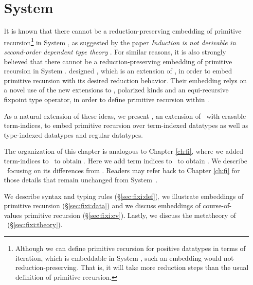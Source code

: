 \chapter{System \Fixi}\label{ch:fixi}

It is known that there cannot be a reduction-preserving embedding of
primitive recursion\footnote{
	Although we can define primitive recursion for positive datatypes
	in terms of iteration, which is embeddable in System \F, such an
	embedding would not reduction-preserving. That is, it will take
	more reduction steps than the usual definition of primitive recursion.
	}
in System \F, as suggested by the paper 
{\it Induction is not derivable in second-order dependent type theory}
\cite{Geuvers01}. For similar reasons, it is also strongly believed that
there cannot be a reduction-preserving embedding of primitive recursion 
in System \Fw. \citet{AbeMat04} designed \Fixw, which is an extension of \Fw,
in order to embed primitive recursion with its desired reduction behavior.
Their embedding relys on a novel use of the new extensions to \Fixw,
polarized kinds and an equi-recursive fixpoint type operator,
in order to define primitive recursion within \Fixw.

As a natural extension of these ideas, we present \Fixi,
an extension of \Fixw\ with erasable term-indices,
to embed primitive recursion over term-indexed datatypes
as well as type-indexed datatypes and regular datatypes.

The organization of this chapter is analogous to Chapter \ref{ch:fi}, 
where we added term-indices to \Fw\ to obtain \Fi. Here
we add term indices to \Fixw\ to obtain \Fixi. We describe \Fixi\ focusing on
its differences from \Fi. Readers may refer back to Chapter \ref{ch:fi} for
those details that remain unchanged from System~\Fi.

We describe syntax and typing rules (\S\ref{sec:fixi:def}),
we illustrate embeddings of primitive recursion (\S\ref{sec:fixi:data})
and we discuss embeddings of course-of-values primitive recursion
(\S\ref{sec:fixi:cv}). Lastly, we
discuss the metatheory of \Fixi\ (\S\ref{sec:fixi:theory}).





